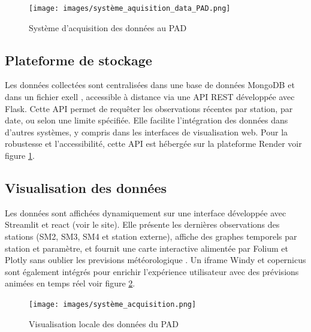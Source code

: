 \documentclass[a4paper,12pt,openany]{report}
\begin{document}
	\begin{figure}[H]
	\begin{center}
                \begin{minipage}{\textwidth}
	    	     \begin{center}
	    	      \texttt{[image: images/système\_aquisition\_data\_PAD.png]}
	    	      \end{center}
	    	     \end{minipage}
		
		
		\caption{Système d'acquisition des données au PAD \label{Fig 2.4}}
	\end{center}
\end{figure}%

	\subsection{Plateforme de stockage}

\quad Les données collectées sont centralisées dans une base de données MongoDB et dans un fichier exell , accessible à distance via une API REST développée avec Flask. Cette API permet de requêter les observations récentes par station, par date, ou selon une limite spécifiée. Elle facilite l'intégration des données dans d'autres systèmes, y compris dans les interfaces de visualisation web. Pour la robustesse et l’accessibilité, cette API est hébergée sur la plateforme Render voir figure \ref{Fig 2.4}.


\subsection{Visualisation des données}

\quad Les données sont affichées dynamiquement sur une interface développée avec Streamlit et react  (voir le site). Elle présente les dernières observations des stations (SM2, SM3, SM4 et station externe), affiche des graphes temporels par station et paramètre, et fournit une carte interactive alimentée par Folium et Plotly sans oublier les previsions météorologique . Un iframe Windy et copernicus  sont  également intégrés pour enrichir l’expérience utilisateur avec des prévisions animées en temps réel voir figure \ref{Fig 2.5}.

	\begin{figure}[H]
	\begin{center}
      \begin{minipage}{\textwidth}
	   \begin{center}
	   \texttt{[image: images/système\_acquisition.png]}
	   \end{center}
	   \end{minipage}
		
		
		\caption{Visualisation locale des données du PAD \label{Fig 2.5} }
	\end{center}
\end{figure}%
\end{document}
